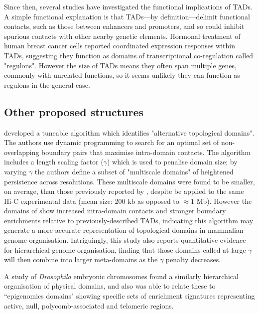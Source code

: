 \documentclass[a4paper,11pt,oneside]{book}
\begin{document}
Since then, several studies have investigated the functional implications of TADs. A simple functional explanation is that TADs---by definition---delimit functional contacts, such as those between enhancers and promoters, and so could inhibit spurious contacts with other nearby genetic elements.\cite{Sexton2015} Hormonal treatment of human breast cancer cells reported coordinated expression responses within TADs, suggesting they function as domains of transcriptional co-regulation called "regulons".\cite{LeDily2014} However the size of TADs means they often span multiple genes, commonly with unrelated functions, so it seems unlikely they can function as regulons in the general case.\cite{Pombo2015}

\subsection{Other proposed structures}

\citet{Filippova2014} developed a tuneable algorithm which identifies "alternative topological domains". The authors use dynamic programming to search for an optimal set of non-overlapping boundary pairs that maximise intra-domain contacts. The algorithm includes a length scaling factor ($\gamma$) which is used to penalise domain size; by varying $\gamma$ the authors define a subset of "multiscale domains" of heightened persistence across resolutions.\cite{Filippova2014} These multiscale domains were found to be smaller, on average, than those previously reported by \citet{Dixon2012}, despite be applied to the same Hi-C experimental data (mean size: 200 kb as opposed to $\approx 1$ Mb). However the domains of \citet{Filippova2014} show increased intra-domain contacts and stronger boundary enrichments relative to previously-described TADs, indicating this algorithm may generate a more accurate representation of topological domains in mammalian genome organisation. Intriguingly, this study also reports quantitative evidence for hierarchical genome organisation, finding that those domains called at large $\gamma$ will then combine into larger meta-domains as the $\gamma$ penalty decreases.

A study of \emph{Drosophila} embryonic chromosomes found a similarly hierarchical organisation of physical domains, and also was able to relate these to ``epigenomics domains" showing specific sets of enrichment signatures representing active, null, polycomb-associated and telomeric regions.\cite{Sexton2012} 
\end{document}

